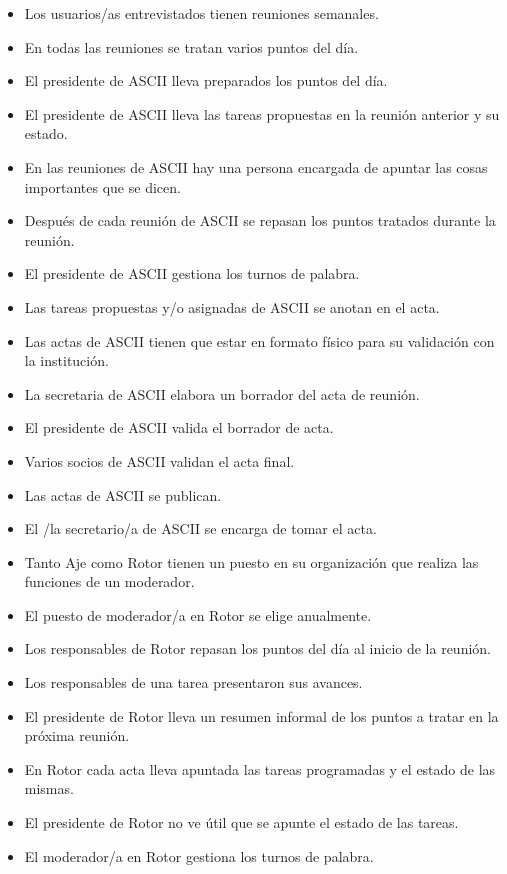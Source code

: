 \documentclass{article}
\begin{document}
\begin{itemize}
\begin{itemize}
\begin{shaded}
\begin{itemize}
					\item Los usuarios/as entrevistados tienen reuniones semanales.
					\item En todas las reuniones se tratan varios puntos del día.
					\item El presidente de ASCII lleva preparados los puntos del día.
					\item El presidente de ASCII lleva las tareas propuestas en la reunión anterior y su estado.
					\item En las reuniones de ASCII hay una persona encargada de apuntar las cosas importantes que se dicen.
					\item Después de cada reunión de ASCII se repasan los puntos tratados durante la reunión.
					\item El presidente de ASCII gestiona los turnos de palabra.
					\item Las tareas propuestas y/o asignadas de ASCII se anotan en el acta.
					\item Las actas de ASCII tienen que estar en formato físico para su validación con la institución.
					\item La secretaria de ASCII elabora un borrador del acta de reunión.
					\item El presidente de ASCII valida el borrador de acta.
					\item Varios socios de ASCII validan el acta final.
					\item Las actas de ASCII se publican.
					\item El /la secretario/a de ASCII se encarga de tomar el acta.
					\item Tanto Aje como Rotor tienen un puesto en su organización que realiza las funciones de un moderador.
					\item El puesto de moderador/a en Rotor se elige anualmente.
					\item Los responsables de Rotor repasan los puntos del día al inicio de la reunión.
					\item Los responsables de una tarea presentaron sus avances.
					\item El presidente de Rotor lleva un resumen informal de los puntos a tratar en la próxima reunión.
					\item En Rotor cada acta lleva apuntada las tareas programadas y el estado de las mismas.
					\item El presidente de Rotor no ve útil que se apunte el estado de las tareas.
					\item El moderador/a en Rotor gestiona los turnos de palabra.

\end{itemize}
\end{shaded}
\end{itemize}
\end{itemize}
\end{document}
